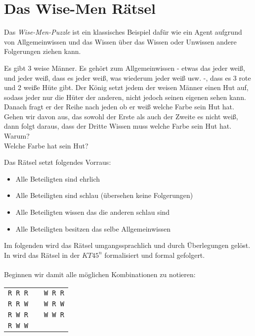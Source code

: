 

\section{Das Wise-Men Rätsel} %
\label{sub:das_wise_men_raetsel}

Das \emph{Wise-Men-Puzzle} ist ein klassisches Beispiel dafür wie ein Agent aufgrund von Allgemeinwissen und das Wissen über das Wissen oder Unwissen andere Folgerungen ziehen kann.

\begin{puzzle}
	\label{puz:wiseMen}
	Es gibt 3 weise Männer.
	Es gehört zum Allgemeinwissen - etwas das jeder weiß, und jeder weiß, dass es jeder weiß, was wiederum jeder weiß usw. -, dass es 3 rote und 2 weiße Hüte gibt.
	Der König setzt jedem der weisen Männer einen Hut auf, sodass jeder nur die Hüter der anderen, nicht jedoch seinen eigenen sehen kann.
	Danach fragt er der Reihe nach jeden ob er weiß welche Farbe sein Hut hat.
	Gehen wir davon aus, das sowohl der Erste als auch der Zweite es nicht weiß, dann folgt daraus, dass der Dritte Wissen muss welche Farbe sein Hut hat.
	\\
	Warum?\\
	Welche Farbe hat sein Hut?
\end{puzzle}
%
%
Das Rätsel setzt folgendes Vorraus:
\begin{itemize}
	\item Alle Beteiligten sind ehrlich
	\item Alle Beteiligten sind schlau (übersehen keine Folgerungen)
	\item Alle Beteiligten wissen das die anderen schlau sind
	\item Alle Beteiligten besitzen das selbe Allgemeinwissen
\end{itemize}
%
%
Im folgenden wird das Rätsel umgangssprachlich und durch Überlegungen gelöst. In  wird das Rätsel in der \MML $KT45^n$ formalisiert und formal gefolgert.\\
\\
Beginnen wir damit alle möglichen Kombinationen zu notieren:\\
%
\begin{tabular}{ccc}
\texttt{R R R} &   & \texttt{W R R}\\
\texttt{R R W} &   & \texttt{W R W}\\
\texttt{R W R} &   & \texttt{W W R}\\
\texttt{R W W} &   &   \\
\end{tabular}
